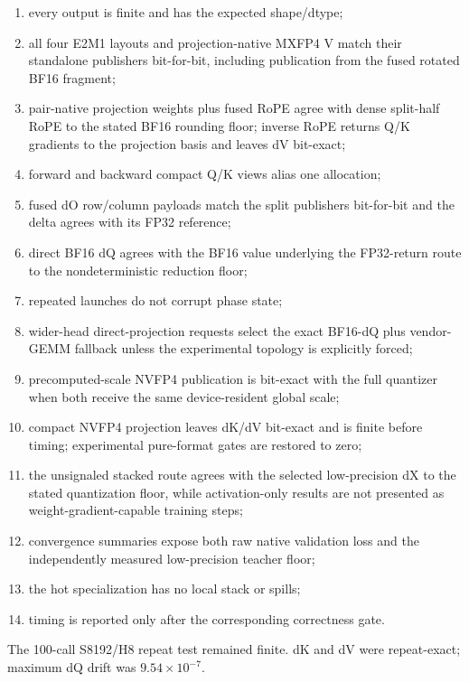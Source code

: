 \begin{enumerate}
  \item every output is finite and has the expected shape/dtype;
  \item all four E2M1 layouts and projection-native MXFP4 V match their
  standalone publishers bit-for-bit, including publication from the fused
  rotated BF16 fragment;
  \item pair-native projection weights plus fused RoPE agree with dense
  split-half RoPE to the stated BF16 rounding floor; inverse RoPE returns Q/K
  gradients to the projection basis and leaves dV bit-exact;
  \item forward and backward compact Q/K views alias one allocation;
  \item fused dO row/column payloads match the split publishers bit-for-bit
  and the delta agrees with its FP32 reference;
  \item direct BF16 dQ agrees with the BF16 value underlying the FP32-return
  route to the nondeterministic reduction floor;
  \item repeated launches do not corrupt phase state;
  \item wider-head direct-projection requests select the exact BF16-dQ plus
  vendor-GEMM fallback unless the experimental topology is explicitly forced;
  \item precomputed-scale NVFP4 publication is bit-exact with the full
  quantizer when both receive the same device-resident global scale;
  \item compact NVFP4 projection leaves dK/dV bit-exact and is finite before
  timing; experimental pure-format gates are restored to zero;
  \item the unsignaled stacked route agrees with the selected low-precision dX
  to the stated quantization floor, while activation-only results are not
  presented as weight-gradient-capable training steps;
  \item convergence summaries expose both raw native validation loss and the
  independently measured low-precision teacher floor;
  \item the hot specialization has no local stack or spills;
  \item timing is reported only after the corresponding correctness gate.
\end{enumerate}

The 100-call S8192/H8 repeat test remained finite.  dK and dV were
repeat-exact; maximum dQ drift was $9.54\times10^{-7}$.
